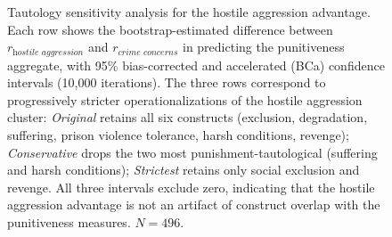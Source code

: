 \begin{figure}[htbp]
  \centering
  \caption{Tautology sensitivity analysis for the hostile aggression advantage. Each row shows the bootstrap-estimated difference between $r_\textit{hostile~aggression}$ and $r_\textit{crime~concerns}$ in predicting the punitiveness aggregate, with 95\% bias-corrected and accelerated (BCa) confidence intervals (10{,}000 iterations). The three rows correspond to progressively stricter operationalizations of the hostile aggression cluster: \textit{Original} retains all six constructs (exclusion, degradation, suffering, prison violence tolerance, harsh conditions, revenge); \textit{Conservative} drops the two most punishment-tautological (suffering and harsh conditions); \textit{Strictest} retains only social exclusion and revenge. All three intervals exclude zero, indicating that the hostile aggression advantage is not an artifact of construct overlap with the punitiveness measures. $N = 496$.}
  \label{fig:bootstrap}
\end{figure}
